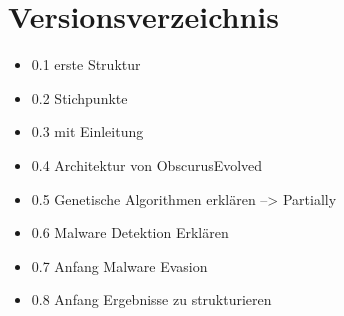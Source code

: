 \section{Versionsverzeichnis}

\begin{itemize}
    \item  0.1 erste Struktur
    \item 0.2 Stichpunkte
    \item 0.3 mit Einleitung
    \item 0.4 Architektur von ObscurusEvolved
    \item 0.5 Genetische Algorithmen erklären --> Partially
    \item 0.6 Malware Detektion Erklären
    \item 0.7 Anfang Malware Evasion
    \item 0.8 Anfang Ergebnisse zu strukturieren
\end{itemize}
